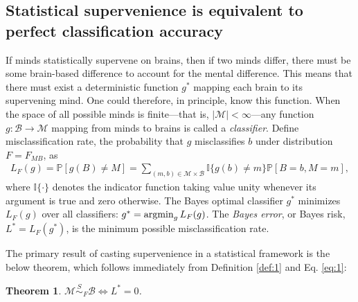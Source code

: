 \documentclass{article}
\newcommand{\mB}{\mathcal{B}}
\newcommand{\mM}{\mathcal{M}}
\newcommand{\PP}{\mathbb{P}}           %
\newcommand{\II}{\mathbb{I}}           %
\providecommand{\mc}[1]{\mathcal{#1}}
\providecommand{\mh}[1]{\widehat{#1}}
\newcommand{\argmin}{\operatornamewithlimits{argmin}}
\newcommand{\MsB}{\mM \overset{S}{\sim}_{F} \mB}
\newcommand{\from}{\colon}
\newtheorem{thm}{Theorem}
\begin{document}
\subsection*{Statistical supervenience is equivalent to perfect classification accuracy} %
\label{sub:theoretical_results}

If minds statistically supervene on brains, 
then if two minds differ, there must be some brain-based difference to account for the mental difference.  This means that there must exist a deterministic function $g^*$ mapping each brain to its supervening mind. One could therefore, in principle, know this function. When the space of all possible minds is finite---that is, $|\mM| < \infty$---any function $g\from \mB \to \mM$ mapping from minds to brains is called a \emph{classifier}.  
Define misclassification rate, the probability that $g$ misclassifies $b$ under distribution $F=F_{MB}$,  as
\begin{align} \label{eq:1}
L_{F}(g) = \PP[g(B) \neq M] =  \sum_{(m,b) \in \mc{M} \times \mc{B}} \II\{g(b) \neq m\} \PP[B=b, M=m],	
\end{align}
where $\II\{\cdot\}$ denotes the indicator function taking value unity whenever its argument is true and zero otherwise.  The Bayes optimal classifier $g^*$ minimizes $L_{F}(g)$ over all classifiers:	
$g^* = \argmin_{g} L_{F}(g)$.
The \emph{Bayes error}, or Bayes risk, $L^*=L_{F}(g^*)$, is the minimum possible misclassification rate.

The primary result of casting supervenience in a statistical framework is the below theorem, which 
follows immediately from Definition \ref{def:1} and Eq. \eqref{eq:1}: 
\begin{thm}
\label{thm:1} 
$\mM \overset{S}{\sim}_{F} \mB \Leftrightarrow L^*= 0$.
\end{thm}
\end{document}
